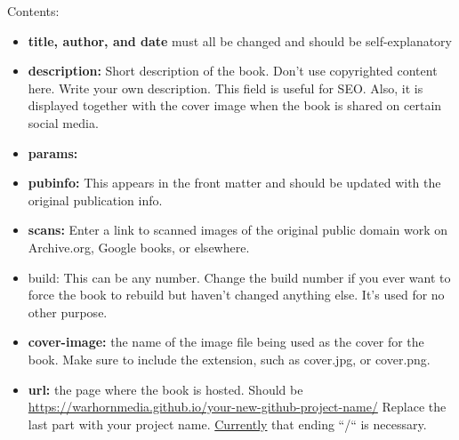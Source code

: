 \documentclass[
]{book}
\providecommand{\tightlist}{%
  \setlength{\itemsep}{0pt}\setlength{\parskip}{0pt}}
\begin{document}
\begin{description}
Contents:

\begin{itemize}
\tightlist
\item
  \textbf{title, author, and date} must all be changed and should be self-explanatory
\end{itemize}

\begin{itemize}
\tightlist
\item
  \textbf{description:} Short description of the book. Don't use copyrighted content here. Write your own description. This field is useful for SEO. Also, it is displayed together with the cover image when the book is shared on certain social media.
\end{itemize}

\begin{itemize}
\tightlist
\item
  \textbf{params:}
\end{itemize}

\begin{itemize}
\tightlist
\item
  \textbf{pubinfo:} This appears in the front matter and should be updated with the original publication info.
\end{itemize}

\begin{itemize}
\tightlist
\item
  \textbf{scans:} Enter a link to scanned images of the original public domain work on Archive.org, Google books, or elsewhere.
\end{itemize}

\begin{itemize}
\tightlist
\item
  build: This can be any number. Change the build number if you ever want to force the book to rebuild but haven't changed anything else. It's used for no other purpose.
\end{itemize}

\begin{itemize}
\tightlist
\item
  \textbf{cover-image:} the name of the image file being used as the cover for the book. Make sure to include the extension, such as cover.jpg, or cover.png.
\end{itemize}

\begin{itemize}
\tightlist
\item
  \textbf{url:} the page where the book is hosted. Should be \url{https://warhornmedia.github.io/your-new-github-project-name/} Replace the last part with your project name. \href{https://github.com/rstudio/bookdown/issues/963}{Currently} that ending ``/`` is necessary.
\end{itemize}


\end{description}
\end{document}
